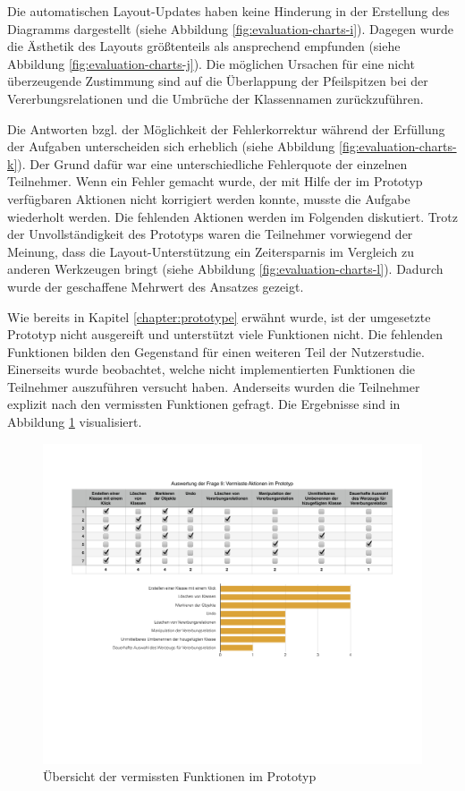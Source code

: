 Die automatischen Layout-Updates haben keine Hinderung in der Erstellung des Diagramms dargestellt (siehe Abbildung \ref{fig:evaluation-charts-i}). Dagegen wurde die Ästhetik des Layouts größtenteils als ansprechend empfunden (siehe Abbildung \ref{fig:evaluation-charts-j}). Die möglichen Ursachen für eine nicht überzeugende Zustimmung sind auf die Überlappung der Pfeilspitzen bei der Vererbungsrelationen und die Umbrüche der Klassennamen zurückzuführen.

Die Antworten bzgl. der Möglichkeit der Fehlerkorrektur während der Erfüllung der Aufgaben unterscheiden sich erheblich (siehe Abbildung \ref{fig:evaluation-charts-k}). Der Grund dafür war eine unterschiedliche Fehlerquote der einzelnen Teilnehmer. Wenn ein Fehler gemacht wurde, der mit Hilfe der im Prototyp verfügbaren Aktionen nicht korrigiert werden konnte, musste die Aufgabe wiederholt werden. Die fehlenden Aktionen werden im Folgenden diskutiert. Trotz der Unvollständigkeit des Prototyps waren die Teilnehmer vorwiegend der Meinung, dass die Layout-Unterstützung ein Zeitersparnis im Vergleich zu anderen Werkzeugen bringt (siehe Abbildung \ref{fig:evaluation-charts-l}). Dadurch wurde der geschaffene Mehrwert des Ansatzes gezeigt.

Wie bereits in Kapitel \ref{chapter:prototype} erwähnt wurde, ist der umgesetzte Prototyp nicht ausgereift und unterstützt viele Funktionen nicht. Die fehlenden Funktionen bilden den Gegenstand für einen weiteren Teil der Nutzerstudie. Einerseits wurde beobachtet, welche nicht implementierten Funktionen die Teilnehmer auszuführen versucht haben. Anderseits wurden die Teilnehmer explizit nach den vermissten Funktionen gefragt. Die Ergebnisse sind in Abbildung \ref{fig:missed-prototype-functions} visualisiert.

\begin{figure}[hbt]
    \centering
    \includegraphics[width=\textwidth]{resources/missed-prototype-functions}
    \caption{Übersicht der vermissten Funktionen im Prototyp}
    \label{fig:missed-prototype-functions}
\end{figure}

